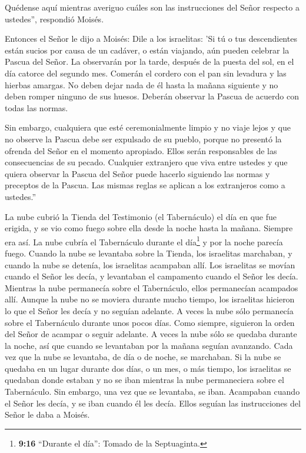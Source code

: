  Quédense aquí mientras averiguo cuáles son las
instrucciones del Señor respecto a ustedes'', respondió Moisés.

 Entonces el Señor le dijo a Moisés:  Dile a
los israelitas: 'Si tú o tus descendientes están sucios por causa de un
cadáver, o están viajando, aún pueden celebrar la Pascua del Señor.
 La observarán por la tarde, después de la puesta del sol,
en el día catorce del segundo mes. Comerán el cordero con el pan sin
levadura y las hierbas amargas.  No deben dejar nada de él
hasta la mañana siguiente y no deben romper ninguno de sus huesos.
Deberán observar la Pascua de acuerdo con todas las normas.

 Sin embargo, cualquiera que esté ceremonialmente limpio y
no viaje lejos y que no observe la Pascua debe ser expulsado de su
pueblo, porque no presentó la ofrenda del Señor en el momento apropiado.
Ellos serán responsables de las consecuencias de su pecado.
 Cualquier extranjero que viva entre ustedes y que quiera
observar la Pascua del Señor puede hacerlo siguiendo las normas y
preceptos de la Pascua. Las mismas reglas se aplican a los extranjeros
como a ustedes.''

 La nube cubrió la Tienda del Testimonio (el Tabernáculo)
el día en que fue erigida, y se vio como fuego sobre ella desde la noche
hasta la mañana.  Siempre era así. La nube cubría el
Tabernáculo durante el día\footnote{\textbf{9:16} ``Durante el día'':
  Tomado de la Septuaginta.} y por la noche parecía fuego. 
Cuando la nube se levantaba sobre la Tienda, los israelitas marchaban, y
cuando la nube se detenía, los israelitas acampaban allí. 
Los israelitas se movían cuando el Señor les decía, y levantaban el
campamento cuando el Señor les decía. Mientras la nube permanecía sobre
el Tabernáculo, ellos permanecían acampados allí.  Aunque
la nube no se moviera durante mucho tiempo, los israelitas hicieron lo
que el Señor les decía y no seguían adelante.  A veces la
nube sólo permanecía sobre el Tabernáculo durante unos pocos días. Como
siempre, siguieron la orden del Señor de acampar o seguir adelante.
 A veces la nube sólo se quedaba durante la noche, así que
cuando se levantaban por la mañana seguían avanzando. Cada vez que la
nube se levantaba, de día o de noche, se marchaban.  Si la
nube se quedaba en un lugar durante dos días, o un mes, o más tiempo,
los israelitas se quedaban donde estaban y no se iban mientras la nube
permaneciera sobre el Tabernáculo. Sin embargo, una vez que se
levantaba, se iban.  Acampaban cuando el Señor les decía, y
se iban cuando él les decía. Ellos seguían las instrucciones del Señor
le daba a Moisés.

